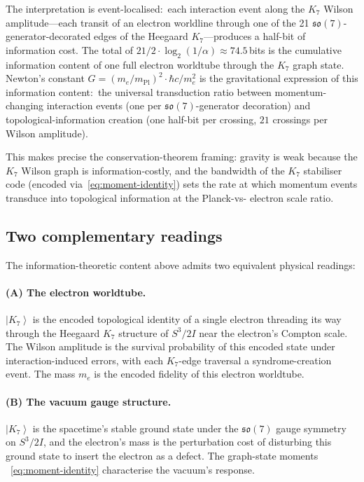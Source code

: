 \documentclass[11pt]{article}
\newcommand{\so}{\mathfrak{so}}
\newcommand{\ket}[1]{\left|#1\right\rangle}
\newcommand{\mPl}{m_{\mathrm{Pl}}}
\begin{document}
The interpretation is event-localised:\ each interaction event
along the $K_7$ Wilson amplitude---each transit of an electron
worldline through one of the 21 $\so(7)$-generator-decorated edges
of the Heegaard $K_7$---produces a half-bit of information cost.
The total of $21/2 \cdot \log_2(1/\alpha) \approx 74.5$\,bits is
the cumulative information content of one full electron worldtube
through the $K_7$ graph state.  Newton's constant
$G = (m_e/\mPl)^2 \cdot \hbar c/m_e^2$ is the gravitational
expression of this information content:\ the universal transduction
ratio between momentum-changing interaction events (one per
$\so(7)$-generator decoration) and topological-information creation
(one half-bit per crossing, $21$ crossings per Wilson amplitude).

This makes precise the conservation-theorem framing: gravity is
weak because the $K_7$ Wilson graph is information-costly,
and the bandwidth of the $K_7$ stabiliser code (encoded
via~\eqref{eq:moment-identity}) sets the rate at which momentum
events transduce into topological information at the Planck-vs-
electron scale ratio.

\subsection{Two complementary readings}
\label{sec:qec-two-readings}

The information-theoretic content above admits two equivalent
physical readings:

\paragraph{(A)  The electron worldtube.}
$\ket{K_7}$ is the encoded topological identity of a single electron
threading its way through the Heegaard $K_7$ structure of $S^3/2I$
near the electron's Compton scale.  The Wilson amplitude is the
survival probability of this encoded state under interaction-induced
errors, with each $K_7$-edge traversal a syndrome-creation event.
The mass $m_e$ is the encoded fidelity of this electron worldtube.

\paragraph{(B)  The vacuum gauge structure.}
$\ket{K_7}$ is the spacetime's stable ground state under the
$\so(7)$ gauge symmetry on $S^3/2I$, and the electron's mass is the
perturbation cost of disturbing this ground state to insert the
electron as a defect.  The graph-state moments
~\eqref{eq:moment-identity} characterise the vacuum's response.
\end{document}
